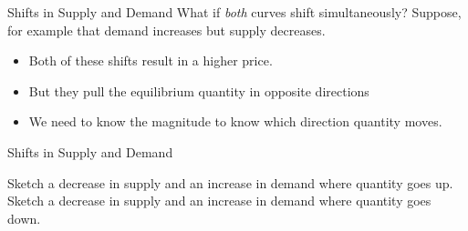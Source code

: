 \documentclass[12pt,t]{beamer}
\begin{document}
\begin{frame}{Shifts in Supply and Demand}
  What if \textit{both} curves shift simultaneously? Suppose, for example that demand increases but supply decreases.

  \begin{itemize}
    \item Both of these shifts result in a higher price.

    \item But they pull the equilibrium quantity in opposite directions

    \item We need to know the magnitude to know which direction quantity moves.
  \end{itemize}
\end{frame}

\begin{frame}{Shifts in Supply and Demand}

  \bigskip
  Sketch a decrease in supply and an increase in demand where quantity goes up.
  Sketch a decrease in supply and an increase in demand where quantity goes down.
\end{frame}

\end{document}
